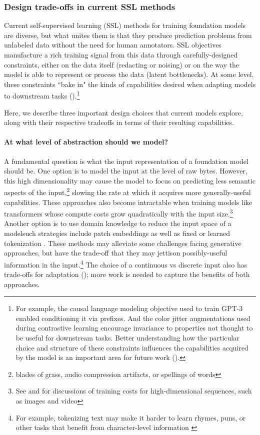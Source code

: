 \subsubsection{Design trade-offs in current SSL methods}
Current self-supervised learning (SSL) methods for training foundation models are diverse, but what unites them is that they produce prediction problems from unlabeled data without the need for human annotators. SSL objectives manufacture a rich training signal from this data through carefully-designed constraints, either on the data itself (\eg redacting or noising) or on the way the model is able to represent or process the data (\eg latent bottlenecks). At some level, these constraints ``bake in" the kinds of capabilities desired when adapting models to downstream tasks ().\footnote{For example, the causal language modeling objective used to train GPT-3 \citep{brown2020gpt3} enabled conditioning it via prefixes. And the color jitter augmentations used during contrastive learning \citep{chen2020simclr} encourage invariance to properties not thought to be useful for downstream tasks. Better understanding how the particular choice and structure of these constraints influences the capabilities acquired by the model is an important area for future work ().}

Here, we describe three important design choices that current models explore, along with their respective tradeoffs in terms of their resulting capabilities.

\paragraph{At what level of abstraction should we model?} A fundamental question is what the input representation of a foundation model should be. One option is to model the input at the level of raw bytes. However, this high dimensionality may cause the model to focus on predicting less semantic aspects of the  input,\footnote{\eg blades of grass, audio compression artifacts, or spellings of words} slowing the rate at which it acquires more generally-useful capabilities. These approaches also become intractable when training models like transformers \citep{vaswani2017attention} whose compute costs grow quadratically with the input size.\footnote{See  and  for discussions of training costs for high-dimensional sequences, such as images and video} Another option is to use domain knowledge to reduce the input space of a model\dash{}such strategies include patch embeddings \citep{visual_transformer} as well as fixed or learned tokenization \citep{Schuster2012JapaneseAK, Sennrich2016NeuralMT, Kudo2018SentencePieceAS, Oord2017NeuralDR, ramesh2021zeroshot}. These methods may alleviate some challenges facing generative approaches, but have the trade-off that they may jettison possibly-useful information in the input.\footnote{For example, tokenizing text may make it harder to learn rhymes, puns, or other tasks that benefit from character-level information \citep{branwen2020gpt}} The choice of a continuous vs discrete input also has trade-offs for adaptation (); more work is needed to capture the benefits of both approaches.


